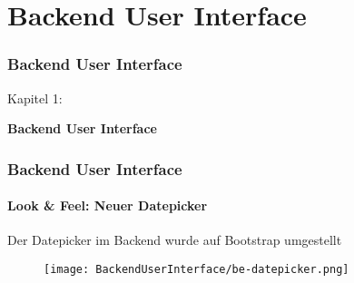 %

\section{Backend User Interface}
\begin{frame}[fragile]
	\frametitle{Backend User Interface}

	\begin{center}\huge{Kapitel 1:}\end{center}
	\begin{center}\huge{\color{typo3darkgrey}\textbf{Backend User Interface}}\end{center}

\end{frame}


\begin{frame}[fragile]
	\frametitle{Backend User Interface}
	\framesubtitle{Look \& Feel: Neuer Datepicker}

	Der Datepicker im Backend wurde auf Bootstrap umgestellt

	\begin{figure}
		\texttt{[image: BackendUserInterface/be-datepicker.png]}
	\end{figure}

\end{frame}




